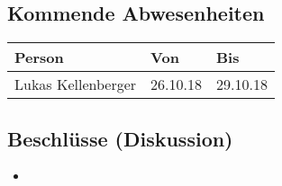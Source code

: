 \subsection*{Kommende Abwesenheiten}
\begin{table}[H]
    \centering
    \begin{tabular}{p{6cm} p{5cm} p{5cm}}
        \textbf{Person} & \textbf{Von} & \textbf{Bis} \\ \hline
        Lukas Kellenberger & 26.10.18 & 29.10.18 \\ \hline
    \end{tabular}
\end{table}

\subsection*{Beschlüsse (Diskussion)}
\begin{itemize}
\item 
\end{itemize}

